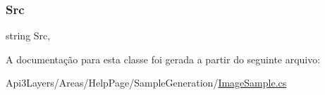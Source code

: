 \subsubsection{\texorpdfstring{Src}{Src}}
{\footnotesize\ttfamily string Src\hspace{0.3cm}{\ttfamily [get]}, {}}



A documentação para esta classe foi gerada a partir do seguinte arquivo\+:\begin{DoxyCompactItemize}
\item 
Api3\+Layers/\+Areas/\+Help\+Page/\+Sample\+Generation/\hyperlink{ImageSample_8cs}{Image\+Sample.\+cs}\end{DoxyCompactItemize}
